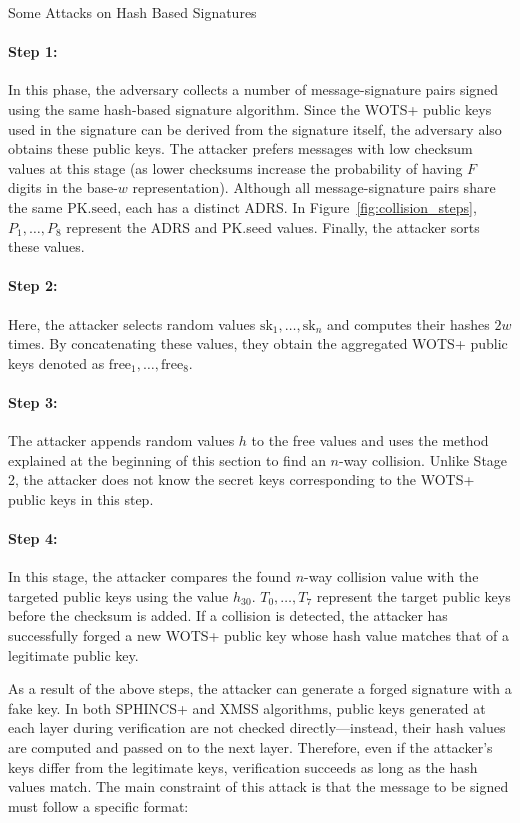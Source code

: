 \documentclass [version=submission]{iacrcc}
\begin{document}
\begin{section}{Some Attacks on Hash Based Signatures}
\paragraph{Step 1:}
In this phase, the adversary collects a number of message-signature pairs signed using the same hash-based signature algorithm. Since the WOTS+ public keys used in the signature can be derived from the signature itself, the adversary also obtains these public keys. The attacker prefers messages with low checksum values at this stage (as lower checksums increase the probability of having \( F \) digits in the base-\( w \) representation). Although all message-signature pairs share the same \( \text{PK.seed} \), each has a distinct ADRS. In Figure~\ref{fig:collision_steps}, \( P_1, \ldots, P_8 \) represent the ADRS and PK.seed values. Finally, the attacker sorts these values.

\paragraph{Step 2:}
Here, the attacker selects random values \( \text{sk}_1, \ldots, \text{sk}_n \) and computes their hashes \( 2w \) times. By concatenating these values, they obtain the aggregated WOTS+ public keys denoted as \( \text{free}_1, \ldots, \text{free}_8 \).

\paragraph{Step 3:}
The attacker appends random values \( h \) to the free values and uses the method explained at the beginning of this section to find an \( n \)-way collision. Unlike Stage 2, the attacker does not know the secret keys corresponding to the WOTS+ public keys in this step.

\paragraph{Step 4:}
In this stage, the attacker compares the found \( n \)-way collision value with the targeted public keys using the value \( h_{30} \). \( T_0, \ldots, T_7 \) represent the target public keys before the checksum is added. If a collision is detected, the attacker has successfully forged a new WOTS+ public key whose hash value matches that of a legitimate public key.

As a result of the above steps, the attacker can generate a forged signature with a fake key. In both SPHINCS+ and XMSS algorithms, public keys generated at each layer during verification are not checked directly—instead, their hash values are computed and passed on to the next layer. Therefore, even if the attacker’s keys differ from the legitimate keys, verification succeeds as long as the hash values match. The main constraint of this attack is that the message to be signed must follow a specific format:


\end{section}
\end{document}

